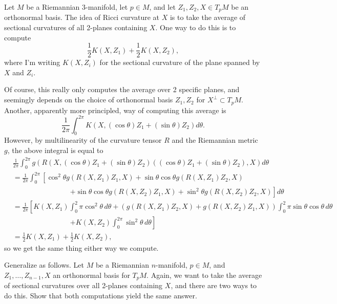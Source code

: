 \begin{example}\label{ex:averaging sectional curvatures}
	Let $M$ be a Riemannian 3-manifold, let $p \in M$, and let $Z_1,Z_2,X \in T_pM$ be an orthonormal basis. The idea of Ricci curvature at $X$ is to take the average of sectional curvatures of all 2-planes containing $X$. One way to do this is to compute
	\[
		\frac{1}{2} K(X,Z_1) + \frac{1}{2} K(X,Z_2),
	\]
	where I'm writing $K(X,Z_i)$ for the sectional curvature of the plane spanned by $X$ and $Z_i$. 
	
	Of course, this really only computes the average over 2 specific planes, and seemingly depends on the choice of orthonormal basis $Z_1,Z_2$ for $X^\bot \subset T_pM$. Another, apparently more principled, way of computing this average is
	\[
		\frac{1}{2\pi} \int_0^{2\pi} K(X, (\cos \theta) Z_1 + (\sin \theta)Z_2)d\theta.
	\]
	However, by multilinearity of the curvature tensor $R$ and the Riemannian metric $g$, the above integral is equal to
	\begin{align*}
		& \frac{1}{2\pi} \int_0^{2\pi} g(R(X, (\cos \theta) Z_1 + (\sin \theta)Z_2)((\cos \theta) Z_1 + (\sin \theta)Z_2),X) d\theta \\
		 & = \frac{1}{2\pi} \int_0^{2\pi} \left[ \cos^2 \theta g(R(X,Z_1)Z_1,X) + \sin\theta\cos\theta g(R(X,Z_1)Z_2,X) \right.\\
		& \qquad \qquad \qquad \qquad \left. + \sin\theta\cos\theta g(R(X,Z_2)Z_1,X) + \sin^2\theta g(R(X,Z_2)Z_2,X)\right]d\theta \\
		& = \frac{1}{2\pi} \left[ K(X,Z_1) \int_0^2\pi \cos^2 \theta\, d\theta  + (g(R(X,Z_1)Z_2,X) + g(R(X,Z_2)Z_1,X)) \int_0^2\pi \sin \theta \cos \theta\, d\theta \right. \\
		& \qquad \qquad \qquad \qquad \left. + K(X,Z_2)\int_0^{2\pi} \sin^2\theta \, d\theta\right] \\
		& = \frac{1}{2} K(X, Z_1) + \frac{1}{2} K(X, Z_2),
	\end{align*}
	so we get the same thing either way we compute.
\end{example}

\begin{exercise}\label{ex:averaging sectional curvatures 2}
	Generalize  as follows. Let $M$ be a Riemannian $n$-manifold, $p\in M$, and $ Z_1, \dots , Z_{n-1}, X$ an orthonormal basis for $T_pM$. Again, we want to take the average of sectional curvatures over all 2-planes containing $X$, and there are two ways to do this. Show that both computations yield the same answer.
\end{exercise}

